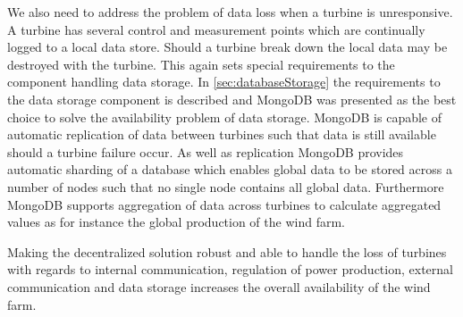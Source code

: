 We also need to address the problem of data loss when a turbine is unresponsive. A turbine has several control and measurement points which are continually logged to a local data store. Should a turbine break down the local data may be destroyed with the turbine. This again sets special requirements to the component handling data storage. In \cref{sec:databaseStorage} the requirements to the data storage component is described and MongoDB was presented as the best choice to solve the availability problem of data storage. MongoDB is capable of automatic replication of data between turbines such that data is still available should a turbine failure occur. As well as replication MongoDB provides automatic sharding of a database which enables global data to be stored across a number of nodes such that no single node contains all global data. Furthermore MongoDB supports aggregation of data across turbines to calculate aggregated values as for instance the global production of the wind farm.

Making the decentralized solution robust and able to handle the loss of turbines with regards to internal communication, regulation of power production, external communication and data storage increases the overall availability of the wind farm. 

\clearpage